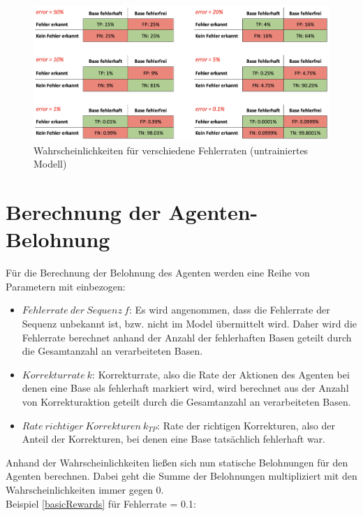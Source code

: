 \documentclass[oneside,bibliography=totocnumbered,BCOR=5mm]{scrbook}%
\theoremstyle{definition}
\theoremstyle{definition}
\theoremstyle{definition}
\theoremstyle{definition}
\theoremstyle{definition}
\theoremstyle{definition}
\begin{document}
\begin{figure}[h]
  \centering
  \includegraphics[width=\textwidth,keepaspectratio]{images/error_rate.png}
  \caption{Wahrscheinlichkeiten für verschiedene Fehlerraten (untrainiertes Modell)}
  \label{probabliltiesForErrorRates}
\end{figure}


\section{Berechnung der Agenten-Belohnung}
Für die Berechnung der Belohnung des Agenten werden eine Reihe von Parametern mit einbezogen:
\begin{itemize}
  \item \(Fehlerrate\:der\:Sequenz\:f\): Es wird angenommen, dass die Fehlerrate der Sequenz unbekannt ist, bzw. nicht im Model übermittelt wird. 
Daher wird die Fehlerrate berechnet anhand der Anzahl der fehlerhaften Basen geteilt durch 
die Gesamtanzahl an verarbeiteten Basen.
\item \(Korrekturrate\:k\): Korrekturrate, also die Rate der Aktionen des Agenten bei denen eine Base als fehlerhaft markiert wird,
 wird berechnet aus der Anzahl von Korrekturaktion geteilt durch die Gesamtanzahl an verarbeiteten Basen.
 \item \(Rate\:richtiger\:Korrekturen\:k_{TP}\): Rate der richtigen Korrekturen, also der Anteil der Korrekturen, bei
 denen eine Base tatsächlich fehlerhaft war.
\end{itemize}


Anhand der Wahrscheinlichkeiten ließen sich nun statische Belohnungen für den Agenten berechnen.
Dabei geht die Summe der Belohnungen multipliziert mit den Wahrscheinlichkeiten immer gegen 0.\\

Beispiel \ref{basicRewards} für Fehlerrate = 0.1:
\end{document}
